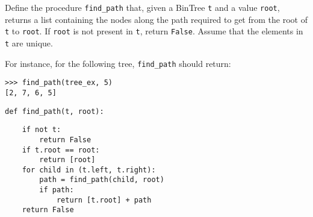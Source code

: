 \question Define the procedure {\tt find\_path} that, given a BinTree {\tt t} and
a value {\tt root}, returns a list containing the nodes along the path
required to get from the root of {\tt t} to {\tt root}. If {\tt root} is not
present in {\tt t}, return {\tt False}. Assume that the elements in {\tt t} are
unique.

For instance, for the following tree, {\tt find\_path} should return:
\begin{center}
\end{center}

\begin{lstlisting}
>>> find_path(tree_ex, 5)
[2, 7, 6, 5]
\end{lstlisting}

\begin{lstlisting}
def find_path(t, root):
\end{lstlisting}
\begin{solution}[1in]
\begin{lstlisting}
    if not t:
        return False
    if t.root == root:
        return [root]
    for child in (t.left, t.right):
        path = find_path(child, root)
        if path:
            return [t.root] + path
    return False
\end{lstlisting}
\end{solution}
